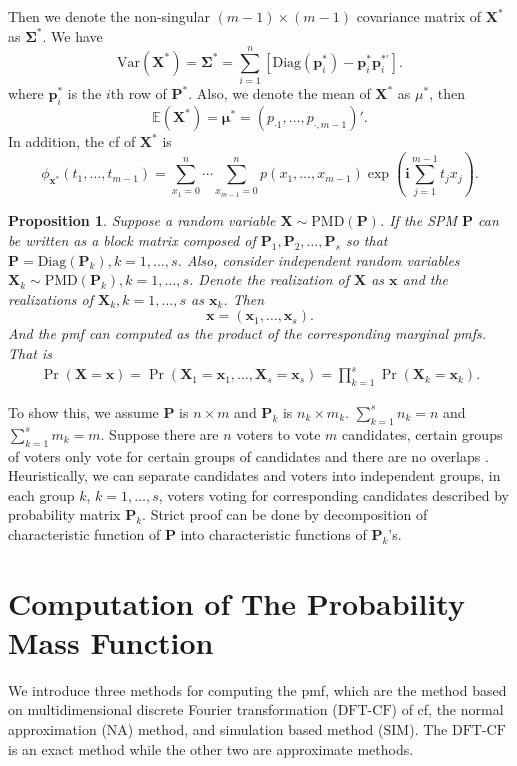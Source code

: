 \documentclass[12pt]{article}
\newcommand{\Sigmavec}{{\boldsymbol{\Sigma}}}
\newcommand{\EE}{\mathbb{E}}
\newcommand{\Pmat}{\mathbf{P}}
\newcommand{\pvec}{\boldsymbol{p}}
\newcommand{\Var}{{\textrm{Var}}}
\newcommand{\ivec}{{\boldsymbol{i}}}
\newcommand{\diag}{\textrm{Diag}}
\newcommand{\PMD}{\textrm{PMD}}
\newcommand{\Xvec}{\boldsymbol{X}}
\newcommand{\xvec}{\boldsymbol{x}}
\newcommand{\muvec}{\boldsymbol{\mu}}
\newcommand{\Sig}{\boldsymbol{\Sigma}}
\newcommand{\SIM}{{\textrm{SIM}}}
\newcommand{\NA}{{\textrm{NA}}}
\newcommand{\dft}{{\textrm{DFT-CF}}}
\newcommand{\qedw}{\hfill \ensuremath{\Box}}
\newtheorem{ppt}{Proposition}
\begin{document}
Then we denote the non-singular $(m-1) \times (m-1)$ covariance matrix of $\Xvec^{\ast}$ as $\Sigmavec^{\ast}$. We have
 $$\Var(\Xvec^{\ast}) =\Sig^{\ast}=\sum_{i=1}^n[\diag(\pvec_i^{\ast})-\pvec_i^{\ast} \pvec_i^{\ast \prime} ].$$
where $\pvec_i^{\ast}$ is the $i$th row of $\Pmat^{\ast}$. Also, we denote the mean of $\Xvec^{\ast}$ as $\mu^{\ast}$, then
  $$\EE(\Xvec^{\ast}) =\muvec^{\ast} = \left( p_{\cdot1} ,\dots,p_{\cdot,m-1}\right)'.$$
 In addition, the cf of $\Xvec^{\ast}$ is 
 \begin{equation*}
\phi_{\xvec^{\ast}}(t_1, \dots, t_{m-1})  =  \sum_{x_1 = 0}^{n} \cdots \sum_{x_{m-1} = 0}^n p(x_1,\ldots,x_{m-1})\exp\left(\ivec\sum_{j=1}^{m-1}t_jx_j\right).
\end{equation*}
 
\begin{ppt}%
Suppose a random variable $\Xvec \sim \PMD(\Pmat)$. If the SPM $\Pmat$ can be written as a block matrix composed of $\Pmat_1, \Pmat_2, \dots, \Pmat_{s}$ so that $\Pmat = \diag(\Pmat_{k}), k=1,\dots,s$. Also, consider independent random variables $\Xvec_{k} \sim \PMD(\Pmat_{k}), k=1,\dots,s$. Denote the realization of $\Xvec$ as $\xvec$ and the realizations of $\Xvec_{k}, k=1,\dots,s$ as $\xvec_k$. Then 
$$\xvec= (\xvec_{1},\dots,\xvec_{s}).$$  
And the pmf can computed as the product of the corresponding marginal pmfs. That is
\begin{align*}
\Pr(\Xvec=\xvec)= \Pr(\Xvec_{1}=\xvec_{1}, \dots, \Xvec_{s}=\xvec_{s})= \prod_{k=1}^s \Pr(\Xvec_{k} = \xvec_{k}).
\end{align*}
\end{ppt}

To show this, we assume $\Pmat$ is $n \times m$ and $\Pmat_{k}$ is $n_k \times m_k$. $\sum_{k=1}^s n_k = n$ and $\sum_{k=1}^s m_k = m$. Suppose there are $n$ voters to vote $m$ candidates, certain groups of voters only vote for certain groups of candidates and there are no overlaps . Heuristically, we can separate candidates and voters into independent groups, in each group $k$, $k = 1,\dots,s$, voters voting for corresponding candidates described by probability matrix $\Pmat_{k}$. Strict proof can be done by decomposition of characteristic function of $\Pmat$ into characteristic functions of $\Pmat_{k}$'s.



\section{Computation of The Probability Mass Function} \label{sec:CA.driving.study}
We introduce three methods for computing the pmf, which are the method based on multidimensional discrete Fourier transformation ($\dft$) of cf, the normal approximation ($\NA$) method, and simulation based method ($\SIM$). The $\dft$ is an exact method while the other two are approximate methods.
\end{document}
